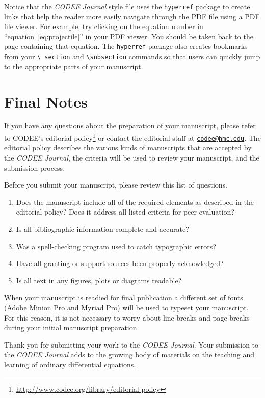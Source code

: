 \documentclass{codee}
\theoremstyle{definition}
\theoremstyle{remark}
\numberwithin{equation}{section}
\begin{document}
Notice that the \textit{CODEE Journal} style file uses the
\texttt{hyperref} package to create links that help the reader more
easily navigate through the PDF file using a PDF file viewer.  For
example, try clicking on the equation number in
``equation~\eqref{eq:projectile}'' in your PDF viewer. You should be
taken back to the page containing that equation. The \texttt{hyperref}
package also creates bookmarks from your \texttt{\textbackslash
  section} and \texttt{\textbackslash subsection} commands so that
users can quickly jump to the appropriate parts of your manuscript.

\section{Final Notes}

If you have any questions about the preparation of your manuscript,
please refer to CODEE's editorial
policy\footnote{\url{http://www.codee.org/library/editorial-policy}}
or contact the editorial staff at
\href{mailto:codee@hmc.edu}{\texttt{codee@hmc.edu}}. The editorial
policy describes the various kinds of manuscripts that are accepted by
the \textit{CODEE Journal}, the criteria will be used to review your
manuscript, and the submission process.

Before you submit your manuscript, please review this list of questions.
\begin{enumerate}
\item Does the manuscript include all of the required elements as
  described in the editorial policy? Does it address all listed criteria for peer evaluation?
\item Is all bibliographic information complete and accurate?
\item Was a spell-checking program used to catch typographic errors?
\item Have all granting or support sources been properly acknowledged?
\item Is all text in any figures, plots or diagrams readable?
\end{enumerate}

When your manuscript is readied for final publication a different set
of fonts (Adobe Minion Pro and Myriad Pro) will be used to typeset
your manuscript. For this reason, it is not necessary to worry about
line breaks and page breaks during your initial manuscript
preparation.

Thank you for submitting your work to the \textit{CODEE Journal}. Your
submission to the \textit{CODEE Journal} adds to the growing body of
materials on the teaching and learning of ordinary differential
equations.


{}
\nocite{*}
\end{document}
